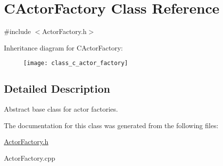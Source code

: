 \hypertarget{class_c_actor_factory}{\section{C\+Actor\+Factory Class Reference}
\label{class_c_actor_factory}
}


{\ttfamily \#include $<$Actor\+Factory.\+h$>$}

Inheritance diagram for C\+Actor\+Factory\+:\begin{figure}[H]
\begin{center}
\leavevmode
\texttt{[image: class\_c\_actor\_factory]}
\end{center}
\end{figure}


\subsection{Detailed Description}
Abstract base class for actor factories. 

The documentation for this class was generated from the following files\+:\begin{DoxyCompactItemize}
\item 
\hyperlink{_actor_factory_8h}{Actor\+Factory.\+h}\item 
Actor\+Factory.\+cpp\end{DoxyCompactItemize}
